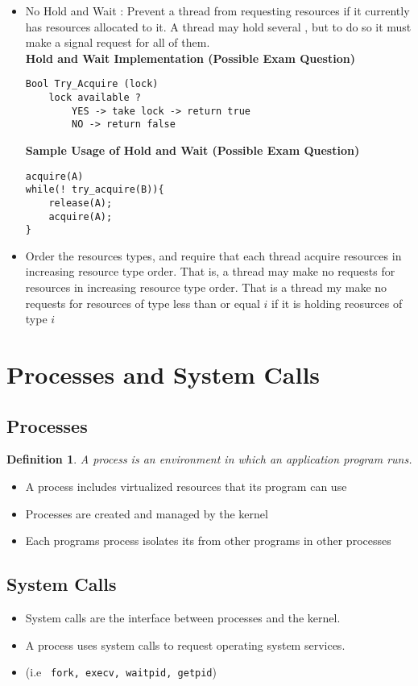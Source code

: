 \documentclass[twoside]{article}
\newtheorem{definition}[theorem]{Definition}
\begin{document}
\begin{itemize}
\item No Hold and Wait : Prevent a thread from requesting resources if it currently has resources allocated to it. A thread may hold several , but to do so it must make a signal request for all of them.\\
\textbf{Hold and Wait Implementation (Possible Exam Question) }  
\begin{lstlisting} 
Bool Try_Acquire (lock) 
	lock available ? 
		YES -> take lock -> return true
		NO -> return false
\end{lstlisting}
\textbf{Sample Usage of Hold and Wait (Possible Exam Question)}
\begin{lstlisting} 
acquire(A)
while(! try_acquire(B)){
	release(A);
	acquire(A);
}
\end{lstlisting}
\item Order the resources types, and require that each thread acquire resources in increasing resource type order. That is, a thread may make no requests for resources in increasing resource type order. That is a thread my make no requests for resources of type less than or equal \(i\) if it is holding reosurces of type \(i\)
\end{itemize}

\section{Processes and System Calls}
\subsection{Processes}

\begin{definition}
A process is an environment in which an application program runs.
\end{definition}
\begin{itemize}
\item A process includes virtualized resources that its program can use
\item Processes are created and managed by the kernel 
\item Each programs process isolates its from other programs in other processes 
\end{itemize}

\subsection{System Calls}
\begin{itemize}
\item System calls are the interface between processes and the kernel. 
\item A process uses system calls to request operating system services.
\item (i.e \verb| fork, execv, waitpid, getpid|)
\end{itemize}
\end{document}
